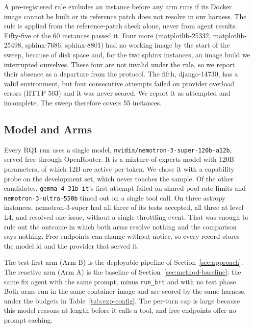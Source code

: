 A pre-registered rule excludes an instance before any arm runs if its Docker
image cannot be built or its reference patch does not resolve in our harness.
The rule is applied from the reference-patch check alone, never from agent
results. Fifty-five of the 60 instances passed it. Four more
(matplotlib-25332, matplotlib-25498, sphinx-7686, sphinx-8801) had no working
image by the start of the sweep, because of disk space and, for the two sphinx
instances, an image build we interrupted ourselves. These four are not invalid
under the rule, so we report their absence as a departure from the protocol.
The fifth, django-14730, has a valid environment, but four consecutive
attempts failed on provider overload errors (HTTP 503) and it was never scored.
We report it as attempted and incomplete. The sweep therefore covers 55
instances.

\subsection{Model and Arms}
\label{sec:exp-arms}

Every RQ1 run uses a single model,
\texttt{nvidia/nemotron-3-super-120b-a12b}, served free through OpenRouter.
It is a mixture-of-experts model with 120B parameters, of which 12B are active
per token.
We chose it with a capability probe on the development set, which never
touches the sample. Of the other candidates, \texttt{gemma-4-31b-it}'s first
attempt failed on shared-pool rate limits and \texttt{nemotron-3-ultra-550b} timed out on a
single tool call. On three astropy instances, nemotron-3-super had all three
of its tests accepted, all three at level L4, and resolved one issue, without
a single throttling event. That was enough to rule out the outcome in which
both arms resolve nothing and the comparison says nothing. Free endpoints can
change without notice, so every record stores the model id and the provider
that served it.

The test-first arm (Arm B) is the deployable pipeline of
Section~\ref{sec:approach}. The reactive arm (Arm A) is the baseline of
Section~\ref{sec:method-baseline}: the same fix agent with the same prompt,
minus \texttt{run\_brt} and with no test phase. Both arms run in the same
container image and are scored by the same harness, under the budgets in
Table~\ref{tab:exp-config}. The per-turn cap is large because this model
reasons at length before it calls a tool, and free endpoints offer no prompt
caching.

